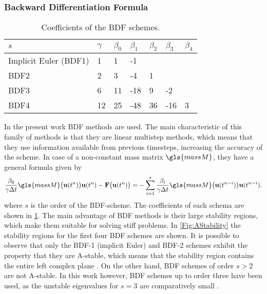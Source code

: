 \subsubsection{Backward Differentiation Formula}
\begin{table}[h]
	\centering
	\begin{tabular}{lllllll}
		\hline
		$s$                   & $\gamma$ & $\beta_0$ & $\beta_1$ & $\beta_2$ & $\beta_3$ & $\beta_4$ \\ \hline
		Implicit Euler (BDF1) & 1        & 1         & -1        &           &           &           \\
		BDF2                  & 2        & 3         & -4        & 1         &           &           \\
		BDF3                  & 6        & 11        & -18       & 9         & -2        &           \\
		BDF4                  & 12       & 25        & -48       & 36        & -16       & 3         \\ \hline
	\end{tabular}
	\caption{Coefficients of the BDF schemes.}
	\label{tab:BDFCoeff}
\end{table}

In the present work BDF methods are used.  The main characteristic of this family of methods is that they are linear multistep methods, which means that they use information available from previous timesteps, increasing the accuracy of the scheme. In case of a non-constant mass matrix $\gls{massM}$, they have a general formula given by
\begin{equation}
	\frac{\beta_0}{\gamma\Delta t}\gls{massM}\bigl(\vec{u}(t^n)\bigr)\vec{u}(t^n)- \vec{F}\bigl(\vec{u}(t^n)\bigr) = - \sum_{i=1}^s \frac{\beta_i}{\gamma \Delta t}\gls{massM}\bigl(\vec{u}(t^{n-i})\bigr)\vec{u}(t^{n-i}).\label{eq:BDFDiscretization}
\end{equation}
where $s$ is the order of the BDF-scheme.  The coefficients of each schema are shown in \cref{tab:BDFCoeff}. The main advantage of BDF methods is their large stability regions, which make them suitable for solving stiff problems.  In \cref{Fig:AStability} the stability regions for the first four BDF schemes are shown. It is possible to observe that only the BDF-1 (implicit Euler) and BDF-2 schemes exhibit the property that they are A-stable, which means that the stability region contains the entire left complex plane \parencite{dahlquistSpecialStabilityProblem1963}. On the other hand, BDF schemes of order $s > 2$ are not A-stable. In this work however, BDF schemes up to order three have been used, as the unstable eigenvalues for $s=3$ are comparatively small \parencite{smudamartinDirectNumericalSimulation2021}.


